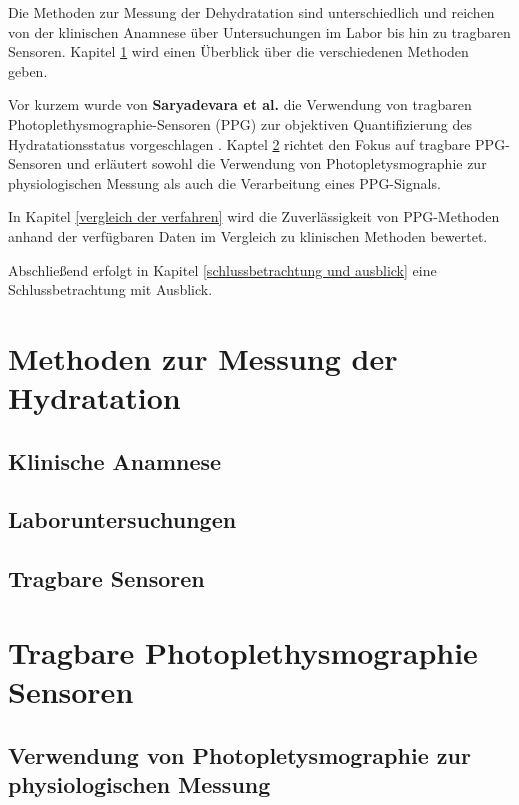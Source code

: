 \documentclass[10pt,a4paper,headinclude,twoside, plainheadsepline, open=right, numbers=noenddot, twocolumn]{article}
\begin{document}
Die Methoden zur Messung der Dehydratation sind unterschiedlich und reichen von der klinischen Anamnese über Untersuchungen im Labor bis hin zu tragbaren Sensoren.
Kapitel \ref{methoden zur messung der hydratation} wird einen Überblick über die verschiedenen Methoden geben. 

Vor kurzem wurde von \textbf{Saryadevara et al.} die Verwendung von tragbaren Photoplethysmographie-Sensoren (PPG) zur objektiven Quantifizierung des Hydratationsstatus vorgeschlagen \cite{suryadevara2015towards}.
Kaptel \ref{tragbare photoplethysmographie sensoren} richtet den Fokus auf tragbare PPG-Sensoren und erläutert sowohl die Verwendung von Photopletysmographie zur physiologischen Messung als auch die Verarbeitung eines PPG-Signals.

In Kapitel \ref{vergleich der verfahren} wird die Zuverlässigkeit von PPG-Methoden anhand der verfügbaren Daten im Vergleich zu klinischen Methoden bewertet.

Abschließend erfolgt in Kapitel \ref{schlussbetrachtung und ausblick} eine Schlussbetrachtung mit Ausblick. 



\section{Methoden zur Messung der Hydratation}
\label{methoden zur messung der hydratation}


\subsection{Klinische Anamnese}
\label{klinische anamnese}


\subsection{Laboruntersuchungen}
\label{laboruntersuchungen}


\subsection{Tragbare Sensoren}
\label{tragbare sensoren}


\section{Tragbare Photoplethysmographie Sensoren}
\label{tragbare photoplethysmographie sensoren}


\subsection{Verwendung von Photopletysmographie zur physiologischen Messung}
\label{verwendung von photopletysmographie zur physiologischen messung}
\end{document}
